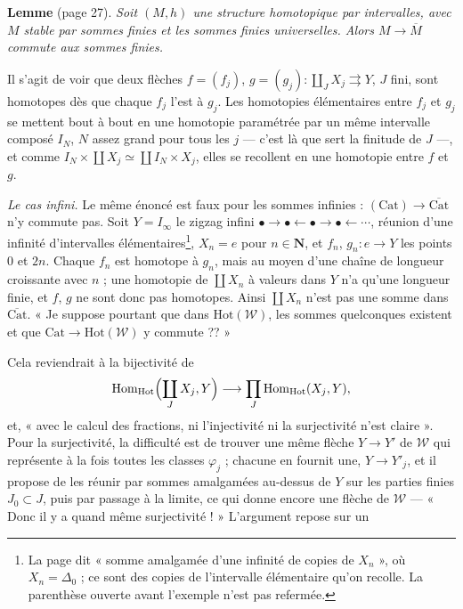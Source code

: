 \documentclass[11pt,a4paper]{article}
\begin{document}
\textbf{Lemme} (page 27). \emph{Soit $(M, h)$ une structure homotopique par
intervalles, avec $M$ stable par sommes finies et les sommes finies
universelles. Alors $M \to \overline{M}$ commute aux sommes finies.}

Il s'agit de voir que deux flèches $f = (f_{j})$, $g = (g_{j}) :
\coprod_{J} X_{j} \rightrightarrows Y$, $J$ fini, sont homotopes dès que
chaque $f_{j}$ l'est à $g_{j}$. Les homotopies élémentaires entre $f_{j}$ et
$g_{j}$ se mettent bout à bout en une homotopie paramétrée par un même
intervalle composé $I_{N}$, $N$ assez grand pour tous les $j$ --- c'est là que
sert la finitude de $J$ ---, et comme $I_{N} \times \coprod X_{j} \simeq
\coprod I_{N} \times X_{j}$, elles se recollent en une homotopie entre $f$ et
$g$.

\emph{Le cas infini.} Le même énoncé est faux pour les sommes infinies :
$(\mathrm{Cat}) \to \overline{\mathrm{Cat}}$ n'y commute pas. Soit
$Y = I_{\infty}$ le zigzag infini $\bullet \to \bullet \leftarrow \bullet \to
\bullet \leftarrow \cdots$, réunion d'une infinité d'intervalles
élémentaires\footnote{La page dit « somme amalgamée d'une infinité de copies
de $X_{n}$ », où $X_{n} = \Delta_{0}$ ; ce sont des copies de l'intervalle
élémentaire qu'on recolle. La parenthèse ouverte avant l'exemple n'est pas
refermée.}, $X_{n} = e$ pour $n \in \mathbf{N}$, et $f_{n}$, $g_{n} : e \to
Y$ les points $0$ et $2n$. Chaque $f_{n}$ est homotope à $g_{n}$, mais au
moyen d'une chaîne de longueur croissante avec $n$ ; une homotopie de
$\coprod X_{n}$ à valeurs dans $Y$ n'a qu'une longueur finie, et $f$, $g$
ne sont donc pas homotopes. Ainsi $\coprod X_{n}$ n'est pas une somme dans
$\overline{\mathrm{Cat}}$. « Je suppose pourtant que dans
$\mathrm{Hot}(\mathcal{W})$, les sommes quelconques existent et que
$\mathrm{Cat} \to \mathrm{Hot}(\mathcal{W})$ y commute ?? »

Cela reviendrait à la bijectivité de
\[
\mathrm{Hom}_{\mathrm{Hot}}\Bigl(\coprod_{J} X_{j}, Y\Bigr) \longrightarrow
\prod_{J} \mathrm{Hom}_{\mathrm{Hot}}(X_{j}, Y),
\]
et, « avec le calcul des fractions, ni l'injectivité ni la surjectivité n'est
claire ». Pour la surjectivité, la difficulté est de trouver une même flèche
$Y \to Y'$ de $\mathcal{W}$ qui représente à la fois toutes les classes
$\varphi_{j}$ ; chacune en fournit une, $Y \to Y'_{j}$, et il propose de les
réunir par sommes amalgamées au-dessus de $Y$ sur les parties finies
$J_{0} \subset J$, puis par passage à la limite, ce qui donne encore une flèche
de $\mathcal{W}$ --- « Donc il y a quand même surjectivité ! » L'argument
repose sur un
\end{document}
